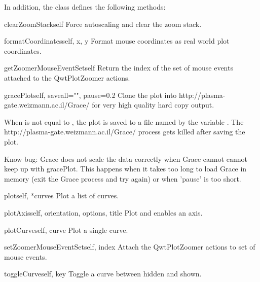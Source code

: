 \documentclass{manual}
\newcommand{\Grace}{\ulink{Grace}
  {http://plasma-gate.weizmann.ac.il/Grace/}}
\begin{document}
In addition, the class  defines the following methods:

\begin{methoddesc}[Plot]{clearZoomStack}{self}
Force autoscaling and clear the zoom stack.
\end{methoddesc}

\begin{methoddesc}[Plot]{formatCoordinates}{self, x, y}
Format mouse coordinates as real world plot coordinates.
\end{methoddesc}

\begin{methoddesc}[Plot]{getZoomerMouseEventSet}{self}
Return the index of the set of mouse events attached to the QwtPlotZoomer
actions.
\end{methoddesc}

\begin{methoddesc}[Plot]{gracePlot}{self, saveall="", pause=0.2}
Clone the plot into \Grace{} for very high quality hard copy output.

When  is not equal to , the plot is saved to a file
named by the variable .
The \Grace{} process gets killed after saving the plot.
 
Know bug: Grace does not scale the data correctly when Grace cannot
cannot keep up with gracePlot.  This happens when it takes too long
to load Grace in memory (exit the Grace process and try again) or
when 'pause' is too short.
\end{methoddesc}

\begin{methoddesc}[Plot]{plot}{self, *curves}
Plot a list of curves.
\end{methoddesc}

\begin{methoddesc}[Plot]{plotAxis}{self, orientation, options, title}
Plot and enables an axis.
\end{methoddesc}

\begin{methoddesc}[Plot]{plotCurve}{self, curve}
Plot a single curve.
\end{methoddesc}

\begin{methoddesc}[Plot]{setZoomerMouseEventSet}{self, index}
Attach the QwtPlotZoomer actions to set of mouse events.
\end{methoddesc}

\begin{methoddesc}[Plot]{toggleCurve}{self, key}
Toggle a curve between hidden and shown.
\end{methoddesc}
\end{document}
